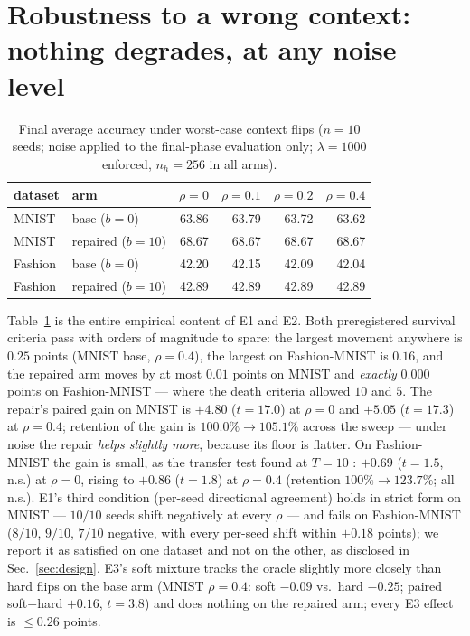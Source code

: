 \documentclass[review,12pt,number]{elsarticle}
\begin{document}
\section{Robustness to a wrong context: nothing degrades, at any noise level}
\label{sec:results}

\begin{table}[t]
\centering
\caption{Final average accuracy under worst-case context flips
($n{=}10$ seeds; noise applied to the final-phase evaluation only;
$\lambda{=}1000$ enforced, $n_h{=}256$ in all arms).}
\label{tab:main}
\begin{tabular}{llrrrr}
\toprule
dataset & arm & $\rho{=}0$ & $\rho{=}0.1$ & $\rho{=}0.2$ & $\rho{=}0.4$ \\
\midrule
MNIST    & base ($b{=}0$)    & 63.86 & 63.79 & 63.72 & 63.62 \\
MNIST    & repaired ($b{=}10$) & 68.67 & 68.67 & 68.67 & 68.67 \\
Fashion  & base ($b{=}0$)    & 42.20 & 42.15 & 42.09 & 42.04 \\
Fashion  & repaired ($b{=}10$) & 42.89 & 42.89 & 42.89 & 42.89 \\
\bottomrule
\end{tabular}
\end{table}

Table~\ref{tab:main} is the entire empirical content of E1 and E2.
Both preregistered survival criteria pass with orders of magnitude to
spare: the largest movement anywhere is $0.25$ points (MNIST base,
$\rho{=}0.4$), the largest on Fashion-MNIST is $0.16$, and the repaired
arm moves by at most $0.01$ points on MNIST and \emph{exactly} $0.000$
points on Fashion-MNIST --- where the death criteria allowed $10$ and
$5$. The repair's paired gain on MNIST is $+4.80$ ($t{=}17.0$) at
$\rho{=}0$ and $+5.05$ ($t{=}17.3$) at $\rho{=}0.4$; retention of the
gain is $100.0\% \to 105.1\%$ across the sweep --- under noise the
repair \emph{helps slightly more}, because its floor is flatter.
On Fashion-MNIST the gain is small, as the transfer test found at $T{=}10$
: $+0.69$ ($t{=}1.5$, n.s.) at $\rho{=}0$, rising
to $+0.86$ ($t{=}1.8$) at $\rho{=}0.4$ (retention $100\% \to 123.7\%$;
all n.s.). E1's third condition (per-seed directional agreement) holds
in strict form on MNIST --- $10/10$ seeds shift negatively at every
$\rho$ --- and fails on Fashion-MNIST ($8/10$, $9/10$, $7/10$ negative,
with every per-seed shift within $\pm 0.18$ points); we report it as
satisfied on one dataset and not on the other, as disclosed in
Sec.~\ref{sec:design}. E3's soft mixture tracks the oracle slightly
more closely than hard flips on the base arm (MNIST $\rho{=}0.4$: soft
$-0.09$ vs.\ hard $-0.25$; paired soft$-$hard $+0.16$, $t{=}3.8$) and
does nothing on the repaired arm; every E3 effect is ${\le} 0.26$
points.
\end{document}
